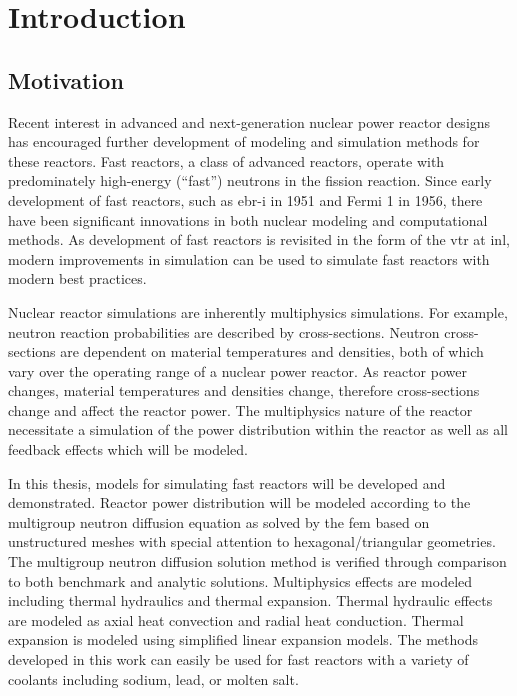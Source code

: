 \chapter{Introduction}
\label{ch:introduction}

\section{Motivation}
  Recent interest in advanced and next-generation nuclear power reactor designs
  has encouraged further development of modeling and simulation methods for
  these reactors.  Fast reactors, a class of advanced reactors, operate with
  predominately high-energy (``fast'') neutrons in the fission reaction. Since
  early development of fast reactors, such as  \gls{ebr-i} in 1951 and Fermi 1
  in 1956, there have been significant innovations in both nuclear modeling and
  computational methods. As development of fast reactors is revisited in the
  form of the \gls{vtr} at \gls{inl}, modern improvements in simulation can be
  used to simulate fast reactors with modern best practices. 
  

  Nuclear reactor simulations are inherently multiphysics simulations. For
  example, neutron reaction probabilities are described by cross-sections.
  Neutron cross-sections are dependent on material temperatures and densities,
  both of which vary over the operating range of a nuclear power reactor. As
  reactor power changes, material temperatures and densities change, therefore
  cross-sections change and affect the reactor power. The multiphysics nature
  of the reactor necessitate a simulation of the power distribution within the
  reactor as well as all feedback effects which will be modeled. 
  
  In this thesis, models for simulating fast reactors will be developed and
  demonstrated. Reactor power distribution will be modeled according to the
  multigroup neutron diffusion equation as solved by the \gls{fem} based on
  unstructured meshes with special attention to hexagonal/triangular geometries.
  The multigroup neutron diffusion solution method is verified through
  comparison to both benchmark and analytic solutions. Multiphysics effects are
  modeled including thermal hydraulics and thermal expansion. Thermal hydraulic
  effects are modeled as axial heat convection and radial heat conduction.
  Thermal expansion is modeled using simplified linear expansion models.  The
  methods developed in this work can easily be used for fast reactors with a
  variety of coolants including sodium, lead, or molten salt.

